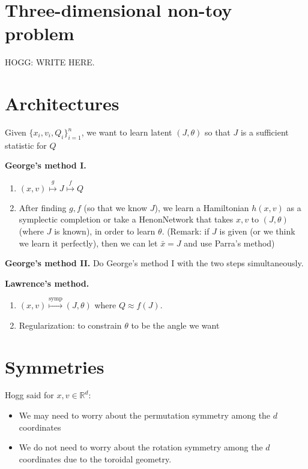 \documentclass{article}
\def \R    {{\mathbb R}}
\begin{document}
\section{Three-dimensional non-toy problem}
HOGG: WRITE HERE.

\section{Architectures}

Given $\{ x_i, v_i, Q_i \}_{i=1}^n$, we want to learn latent $(J, \theta)$ so that $J$ is a sufficient statistic for $Q$

\textbf{George's method I.} 
\begin{enumerate}
    \item $(x, v) \overset{g}{\mapsto} J \overset{f}{\mapsto} Q$
    \item After finding $g, f$ (so that we know $J$), we learn a Hamiltonian $h(x, v)$ as a symplectic completion or take a HenonNetwork that takes $x, v$ to $(J, \theta)$ (where $J$ is known), in order to learn $\theta$. (Remark: if $J$ is given (or we think we learn it perfectly), then we can let $\bar{x} = J$ and use Parra's method)
    
\end{enumerate}

\textbf{George's method II.} 
Do George's method I with the two steps simultaneously.

\textbf{Lawrence's method.}

\begin{enumerate}
    \item $(x, v) \overset{\operatorname{symp}}{\mapsto} (J, \theta) $ where $Q \approx f(J)$.
    \item Regularization: to constrain $\theta$ to be the angle we want
\end{enumerate}


\section{Symmetries}
Hogg said for $x, v \in \R^d$:
\begin{itemize}
\item We may need to worry about the permutation symmetry among the $d$ coordinates
\item We do not need to worry about the rotation symmetry among the $d$ coordinates due to the toroidal geometry.
\end{itemize}
\end{document}
